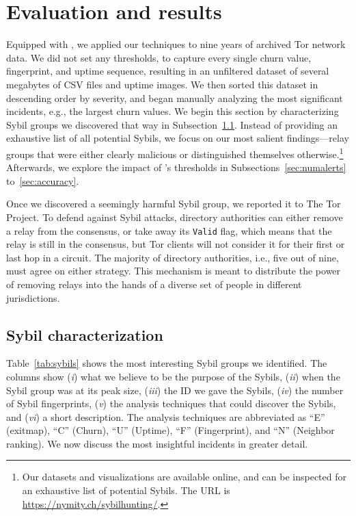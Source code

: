 \section{Evaluation and results}
\label{sec:results}
Equipped with \sys, we applied our techniques to nine years of archived Tor
network data.  We did not set any thresholds, to capture every single churn
value, fingerprint, and uptime sequence, resulting in an unfiltered dataset of
several megabytes of CSV files and uptime images.  We then sorted this dataset
in descending order by severity, and began manually analyzing the most
significant incidents, e.g., the largest churn values.  We begin this section
by characterizing Sybil groups we discovered that way in
Subsection~\ref{sec:sybil_groups}.  Instead of providing an exhaustive list of
all potential Sybils, we focus on our most salient findings---relay groups that
were either clearly malicious or distinguished themselves
otherwise.\footnote{Our datasets and visualizations are available online, and
can be inspected for an exhaustive list of potential Sybils.  The URL is\\
\url{https://nymity.ch/sybilhunting/}.}  Afterwards, we explore the impact of
\sys's thresholds in Subsections~\ref{sec:numalerts} to~\ref{sec:accuracy}.

Once we discovered a seemingly harmful Sybil group, we reported it to The Tor
Project.  To defend against Sybil attacks, directory authorities can either
remove a relay from the consensus, or take away its \texttt{Valid} flag, which
means that the relay is still in the consensus, but Tor clients will not
consider it for their first or last hop in a circuit.  The majority of directory
authorities, i.e., five out of nine, must agree on either strategy.  This
mechanism is meant to distribute the power of removing relays into the hands of
a diverse set of people in different jurisdictions.

\subsection{Sybil characterization}
\label{sec:sybil_groups}
Table~\ref{tab:sybils} shows the most interesting Sybil groups we identified.
The columns show (\emph{i}) what we believe to be the purpose of the Sybils,
(\emph{ii}) when the Sybil group was at its peak size, (\emph{iii}) the ID we
gave the Sybils, (\emph{iv}) the number of Sybil fingerprints, (\emph{v}) the
analysis techniques that could discover the Sybils, and (\emph{vi}) a short
description.  The analysis techniques are abbreviated as ``E'' (exitmap), ``C''
(Churn), ``U'' (Uptime), ``F'' (Fingerprint), and ``N'' (Neighbor ranking).  We
now discuss the most insightful incidents in greater detail.

